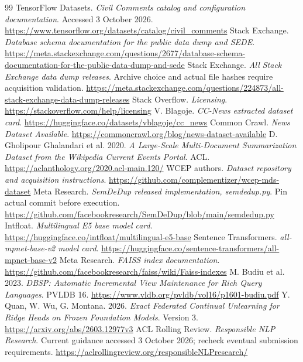 \documentclass[11pt,a4paper]{article}
\begin{document}
\newpage
\begin{thebibliography}{99}\small
{} TensorFlow Datasets. \emph{Civil Comments catalog and configuration documentation}. Accessed 3 October 2026. \url{https://www.tensorflow.org/datasets/catalog/civil_comments}
 Stack Exchange. \emph{Database schema documentation for the public data dump and SEDE}. \url{https://meta.stackexchange.com/questions/2677/database-schema-documentation-for-the-public-data-dump-and-sede}
 Stack Exchange. \emph{All Stack Exchange data dump releases}. Archive choice and actual file hashes require acquisition validation. \url{https://meta.stackexchange.com/questions/224873/all-stack-exchange-data-dump-releases}
 Stack Overflow. \emph{Licensing}. \url{https://stackoverflow.com/help/licensing}
 V. Blagoje. \emph{CC-News extracted dataset card}. \url{https://huggingface.co/datasets/vblagoje/cc_news}
 Common Crawl. \emph{News Dataset Available}. \url{https://commoncrawl.org/blog/news-dataset-available}
 D. Gholipour Ghalandari et al. 2020. \emph{A Large-Scale Multi-Document Summarization Dataset from the Wikipedia Current Events Portal}. ACL. \url{https://aclanthology.org/2020.acl-main.120/}
 WCEP authors. \emph{Dataset repository and acquisition instructions}. \url{https://github.com/complementizer/wcep-mds-dataset}
 Meta Research. \emph{SemDeDup released implementation, semdedup.py}. Pin actual commit before execution. \url{https://github.com/facebookresearch/SemDeDup/blob/main/semdedup.py}
 Intfloat. \emph{Multilingual E5 base model card}. \url{https://huggingface.co/intfloat/multilingual-e5-base}
 Sentence Transformers. \emph{all-mpnet-base-v2 model card}. \url{https://huggingface.co/sentence-transformers/all-mpnet-base-v2}
 Meta Research. \emph{FAISS index documentation}. \url{https://github.com/facebookresearch/faiss/wiki/Faiss-indexes}
 M. Budiu et al. 2023. \emph{DBSP: Automatic Incremental View Maintenance for Rich Query Languages}. PVLDB 16. \url{https://www.vldb.org/pvldb/vol16/p1601-budiu.pdf}
 Y. Quan, W. Wu, G. Montana. 2026. \emph{Exact Federated Continual Unlearning for Ridge Heads on Frozen Foundation Models}. Version 3. \url{https://arxiv.org/abs/2603.12977v3}
 ACL Rolling Review. \emph{Responsible NLP Research}. Current guidance accessed 3 October 2026; recheck eventual submission requirements. \url{https://aclrollingreview.org/responsibleNLPresearch/}
\end{thebibliography}
\end{document}
